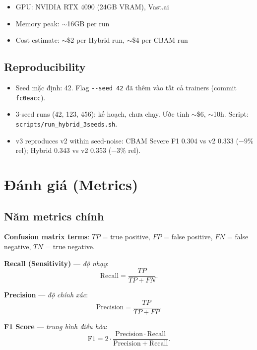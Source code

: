 \documentclass[11pt,a4paper]{article}
\begin{document}
\begin{itemize}[leftmargin=*]
\item GPU: NVIDIA RTX 4090 (24GB VRAM), Vast.ai
\item Memory peak: $\sim$16GB per run
\item Cost estimate: $\sim$\$2 per Hybrid run, $\sim$\$4 per CBAM run
\end{itemize}

\subsection{Reproducibility}

\begin{itemize}[leftmargin=*]
\item Seed mặc định: 42. Flag \verb|--seed 42| đã thêm vào tất cả
trainers (commit \texttt{fc0eacc}).
\item 3-seed runs (42, 123, 456): kế hoạch, chưa chạy. Ước tính
$\sim$\$6, $\sim$10h. Script: \verb|scripts/run_hybrid_3seeds.sh|.
\item v3 reproduces v2 within seed-noise: CBAM Severe F1 0.304 vs v2
0.333 ($-9\%$ rel); Hybrid 0.343 vs v2 0.353 ($-3\%$ rel).
\end{itemize}

\section{Đánh giá (Metrics)}

\subsection{Năm metrics chính}

\noindent\textbf{Confusion matrix terms}: $TP$ = true positive,
$FP$ = false positive, $FN$ = false negative, $TN$ = true negative.

\textbf{Recall (Sensitivity)} --- \emph{độ nhạy}:
\begin{equation}
\mathrm{Recall} = \frac{TP}{TP + FN}.
\label{eq:recall_vi}
\end{equation}

\textbf{Precision} --- \emph{độ chính xác}:
\begin{equation}
\mathrm{Precision} = \frac{TP}{TP + FP}.
\label{eq:precision_vi}
\end{equation}

\textbf{F1 Score} --- \emph{trung bình điều hòa}:
\begin{equation}
\mathrm{F1} = 2 \cdot \frac{\mathrm{Precision} \cdot \mathrm{Recall}}
                          {\mathrm{Precision} + \mathrm{Recall}}.
\label{eq:f1_vi}
\end{equation}
\end{document}
